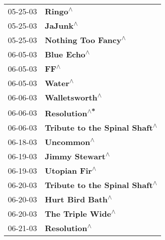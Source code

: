 \begin{supertabular}{p{0.25\columnwidth}p{0.75\columnwidth}}
 05-25-03 &                                                                    \textbf{Ringo\textsuperscript{$\wedge$}} \\
 05-25-03 &                                                                   \textbf{JaJunk\textsuperscript{$\wedge$}} \\
 05-25-03 &                                                        \textbf{Nothing Too Fancy\textsuperscript{$\wedge$}} \\
 06-05-03 &                                                                \textbf{Blue Echo\textsuperscript{$\wedge$}} \\
 06-05-03 &                                                                       \textbf{FF\textsuperscript{$\wedge$}} \\
 06-05-03 &                                                                    \textbf{Water\textsuperscript{$\wedge$}} \\
 06-06-03 &                                                             \textbf{Walletsworth\textsuperscript{$\wedge$}} \\
 06-06-03 &                                                              \textbf{Resolution\textsuperscript{$\wedge$*}} \\
 06-06-03 &                                              \textbf{Tribute to the Spinal Shaft\textsuperscript{$\wedge$}} \\
 06-18-03 &                                                                 \textbf{Uncommon\textsuperscript{$\wedge$}} \\
 06-19-03 &                                                            \textbf{Jimmy Stewart\textsuperscript{$\wedge$}} \\
 06-19-03 &                                                              \textbf{Utopian Fir\textsuperscript{$\wedge$}} \\
 06-20-03 &                                              \textbf{Tribute to the Spinal Shaft\textsuperscript{$\wedge$}} \\
 06-20-03 &                                                           \textbf{Hurt Bird Bath\textsuperscript{$\wedge$}} \\
 06-20-03 &                                                          \textbf{The Triple Wide\textsuperscript{$\wedge$}} \\
 06-21-03 &                                                               \textbf{Resolution\textsuperscript{$\wedge$}} \\

\end{supertabular}
